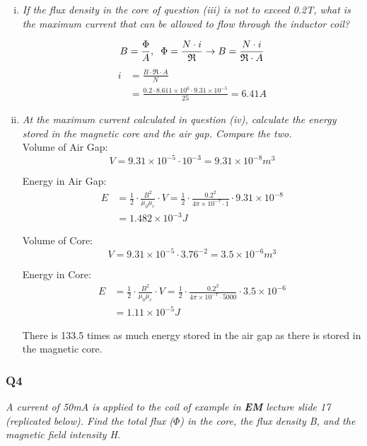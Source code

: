 \documentclass[a4paper,11pt]{article}
\begin{document}
\begin{enumerate}[i.]
    \item \textit{If the flux density in the core of question (iii) is not to exceed 0.2T, what is the maximum current that can be allowed to flow through the inductor coil?}
    
    $$ B = \frac{\Phi}{A}, \hspace{2mm} \Phi = \frac{N \cdot i}{\mathfrak{R}} \rightarrow B = \frac{N \cdot i}{\mathfrak{R} \cdot A} $$
    \begin{align*}
        i&= \frac{B \cdot \mathfrak{R} \cdot A}{N}\\
        &= \frac{0.2\cdot 8.611\times10^6\cdot 9.31\times 10^{-5}}{25} = 6.41A
    \end{align*}


    \item \textit{At the maximum current calculated in question (iv), calculate the energy stored in the magnetic core and the air gap. Compare the two.}\\
    

    Volume of Air Gap:
    $$V = 9.31\times10^{-5}\cdot 10^{-3} = 9.31\times10^{-8}m^3$$

    Energy in Air Gap:
    \begin{align*}
        E &= \frac{1}{2}\cdot \frac{B^2}{\mu_0 \mu_r}\cdot V = \frac{1}{2} \cdot\frac{0.2^2}{4\pi\times10^{-7}\cdot 1}\cdot 9.31\times10^{-8}\\
        &= 1.482\times 10^{-3}J
    \end{align*}


    Volume of Core:
    $$V = 9.31\times10^{-5}\cdot 3.76^{-2} = 3.5\times10^{-6}m^3$$

    Energy in Core:
    \begin{align*}
        E &= \frac{1}{2}\cdot \frac{B^2}{\mu_0 \mu_r}\cdot V = \frac{1}{2}\cdot\frac{0.2^2}{4\pi\times10^{-7}\cdot 5000}\cdot 3.5\times10^{-6}\\
        &= 1.11\times 10^{-5}J
    \end{align*}

    There is 133.5 times as much energy stored in the air gap as there is stored in the magnetic core. \\

\end{enumerate}


\subsubsection*{Q4}
\textit{A current of 50mA is applied to the coil of example in \textbf{EM} lecture slide 17 (replicated below). Find the total flux ($\Phi$) in the core, the flux density B, and the magnetic field intensity H.}
\end{document}
